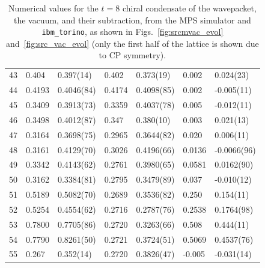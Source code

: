 \documentclass[aps, prc, tightenlines,superscriptaddress, letterpaper, amsmath, amssymb, preprintnumbers, floatfix, longbibliography, nofootinbib]{revtex4-2}
\begin{document}
\begin{table}[!htb]
{\begin{tabularx}{\textwidth}{| c || Y | Y | Y | Y | Y | Y |}
43	&	0.404	&	0.397(14)	&	0.402	&	0.373(19)	&	0.002	&	0.024(23)	\\
44	&	0.4193	&	0.4046(84)	&	0.4174	&	0.4098(85)	&	0.002	&	-0.005(11)	\\
45	&	0.3409	&	0.3913(73)	&	0.3359	&	0.4037(78)	&	0.005	&	-0.012(11)	\\
46	&	0.3498	&	0.4012(87)	&	0.347	&	0.380(10)	&	0.003	&	0.021(13)	\\
47	&	0.3164	&	0.3698(75)	&	0.2965	&	0.3644(82)	&	0.020	&	0.006(11)	\\
48	&	0.3161	&	0.4129(70)	&	0.3026	&	0.4196(66)	&	0.0136	&	-0.0066(96)	\\
49	&	0.3342	&	0.4143(62)	&	0.2761	&	0.3980(65)	&	0.0581	&	0.0162(90)	\\
50	&	0.3162	&	0.3384(81)	&	0.2795	&	0.3479(89)	&	0.037	&	-0.010(12)	\\
51	&	0.5189	&	0.5082(70)	&	0.2689	&	0.3536(82)	&	0.250	&	0.154(11)	\\
52	&	0.5254	&	0.4554(62)	&	0.2716	&	0.2787(76)	&	0.2538	&	0.1764(98)	\\
53	&	0.7800	&	0.7705(86)	&	0.2720	&	0.3263(66)	&	0.508	&	0.444(11)	\\
54	&	0.7790	&	0.8261(50)	&	0.2721	&	0.3724(51)	&	0.5069	&	0.4537(76)	\\
55	&	0.267	&	0.352(14)	&	0.2720	&	0.3826(47)	&	-0.005	&	-0.031(14)	\\ \hline
\end{tabularx}}
\caption{Numerical values for the $t=8$ chiral condensate of the wavepacket, the vacuum, and their subtraction, from the MPS simulator and {\tt ibm\_torino}, as shown in Figs.~\ref{fig:srcmvac_evol} and~\ref{fig:src_vac_evol} (only the first half of the lattice is shown due to CP symmetry).}
 \label{tab:tablet8}
\end{table}
%
\end{document}
